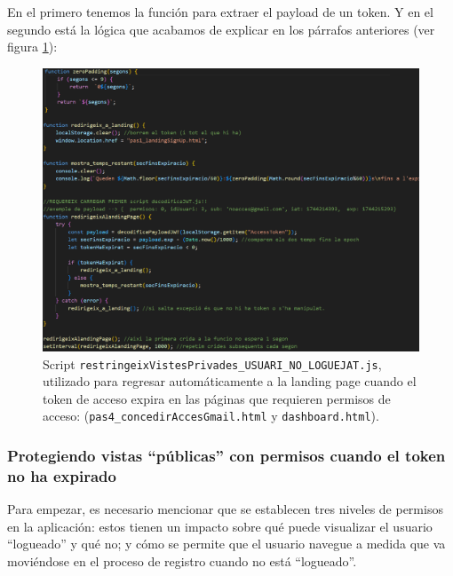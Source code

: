 \documentclass[a4paper,12pt]{report}
\begin{document}
	En el primero tenemos la función para extraer el payload de un token. Y en el segundo está la lógica que acabamos de explicar en los párrafos anteriores (ver figura \ref{fig:restringeixVistesPrivades_USUARI_NO_LOGUEJAT}):
	
	
	\setlength{\belowcaptionskip}{3pt}
	\FloatBarrier
	\begin{figure}[H]
		\centering
		\caption{Script \texttt{restringeixVistesPrivades\_USUARI\_NO\_LOGUEJAT.js}, utilizado para regresar automáticamente a la landing page cuando el token de acceso expira en las páginas que requieren permisos de acceso: (\texttt{pas4\_concedirAccesGmail.html} y \texttt{dashboard.html}).}
		\includegraphics[width=1\linewidth]{img/restringeixVistesPrivades_USUARI_NO_LOGUEJAT.png}

		\label{fig:restringeixVistesPrivades_USUARI_NO_LOGUEJAT}
	\end{figure}
	\FloatBarrier
	
	\subsubsection{Protegiendo vistas ``públicas'' con permisos cuando el token no ha expirado}
	\label{sec:vistasPermisos}
	

	
	Para empezar, es necesario mencionar que se establecen tres niveles de permisos en la aplicación: estos  tienen un impacto sobre qué puede visualizar el usuario ``logueado'' y qué no; y cómo se permite que el usuario navegue a medida que va moviéndose en el proceso de registro cuando no está ``logueado''.
	
\end{document}
